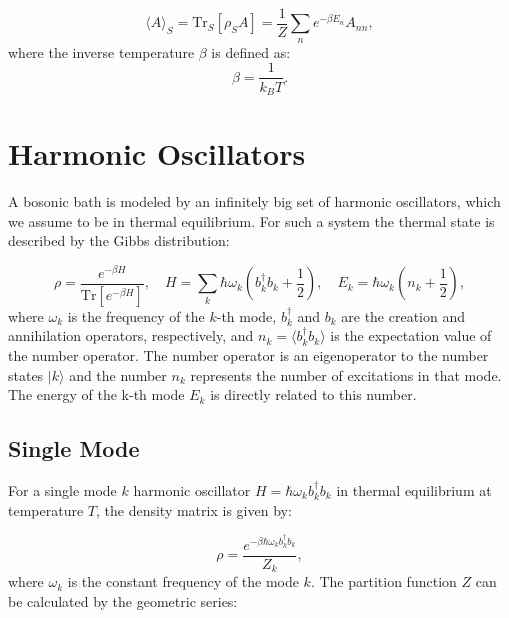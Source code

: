 \begin{equation} \label{eq:expectation_value}
	\langle A \rangle_S = \mathrm{Tr}_S[\rho_S A] = \frac{1}{Z} \sum_n e^{-\beta E_n} A_{nn},
\end{equation}
where the inverse temperature \(\beta\) is defined as:
\begin{equation} \label{eq:beta_definition}
	\beta = \frac{1}{k_B T}.
\end{equation}


\section{Harmonic Oscillators}
A bosonic bath is modeled by an infinitely big set of harmonic oscillators, which we assume to be in thermal equilibrium.
For such a system the thermal state is described by the Gibbs distribution:

\begin{equation} \label{eq:gibbs_state}
	\rho = \frac{e^{-\beta H}}{\mathrm{Tr}\left[e^{-\beta H}\right]}, \quad H = \sum_k \hbar \omega_k \left(b_k^{\dagger} b_k + \frac{1}{2}\right), \quad E_k = \hbar \omega_k (n_k + \frac{1}{2}),
\end{equation}
where \( \omega_k \) is the frequency of the \( k \)-th mode, \( b_k^{\dagger} \) and \( b_k \) are the creation and annihilation operators, respectively, and \( n_k = \langle b_k^{\dagger} b_k \rangle \) is the expectation value of the  number operator.
The number operator is an eigenoperator to the number states \(|k\rangle\)
and the number $n_k$ represents the number of excitations in that mode.
The energy of the k-th mode $ E_k $ is directly related to this number.

\subsection{Single Mode}
For a single mode \( k \) harmonic oscillator \( H = \hbar \omega_k b_k^{\dagger} b_k \) in thermal equilibrium at temperature \( T \), the density matrix is given by:

\begin{equation} \label{eq:single_mode_density_matrix}
	\rho = \frac{e^{-\beta \hbar \omega_k b_k^{\dagger} b_k}}{Z_k},
\end{equation}
where \( \omega_k \) is the constant frequency of the mode \( k \).
The partition function \( Z \) can be calculated by the geometric series:

